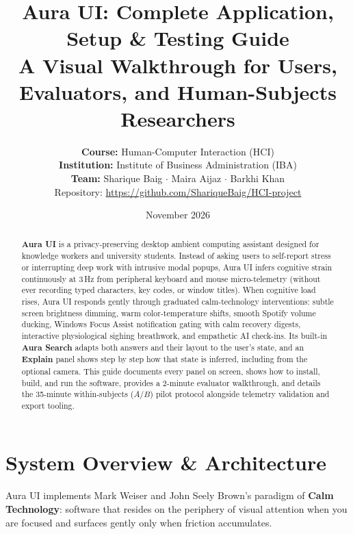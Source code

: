 \documentclass[11pt,a4paper]{article}
\title{
    \vspace{-1.3cm}
    \textbf{\Large Aura UI: Complete Application, Setup \& Testing Guide} \\
    \large A Visual Walkthrough for Users, Evaluators, and Human-Subjects Researchers
}
\author{
    \textbf{Course:} Human-Computer Interaction (HCI) \\[0.12cm]
    \textbf{Institution:} Institute of Business Administration (IBA) \\[0.15cm]
    \textbf{Team:} Sharique Baig \quad $\cdot$ \quad Maira Aijaz \quad $\cdot$ \quad Barkhi Khan \\[0.15cm]
    \small Repository: \url{https://github.com/ShariqueBaig/HCI-project}
}
\date{November 2026}
\begin{document}
\maketitle
\thispagestyle{fancy}

\begin{abstract}
\textbf{Aura UI} is a privacy-preserving desktop ambient computing assistant designed for knowledge workers and university students. Instead of asking users to self-report stress or interrupting deep work with intrusive modal popups, Aura UI infers cognitive strain continuously at 3\,Hz from peripheral keyboard and mouse micro-telemetry (without ever recording typed characters, key codes, or window titles). When cognitive load rises, Aura UI responds gently through graduated calm-technology interventions: subtle screen brightness dimming, warm color-temperature shifts, smooth Spotify volume ducking, Windows Focus Assist notification gating with calm recovery digests, interactive physiological sighing breathwork, and empathetic AI check-ins. Its built-in \textbf{Aura Search} adapts both answers and their layout to the user's state, and an \textbf{Explain} panel shows step by step how that state is inferred, including from the optional camera. This guide documents every panel on screen, shows how to install, build, and run the software, provides a 2-minute evaluator walkthrough, and details the 35-minute within-subjects ($A/B$) pilot protocol alongside telemetry validation and export tooling.
\end{abstract}

\tableofcontents
\vspace{0.3cm}

\section{System Overview \& Architecture}

Aura UI implements Mark Weiser and John Seely Brown's paradigm of \textbf{Calm Technology}: software that resides on the periphery of visual attention when you are focused and surfaces gently only when friction accumulates.
\end{document}
